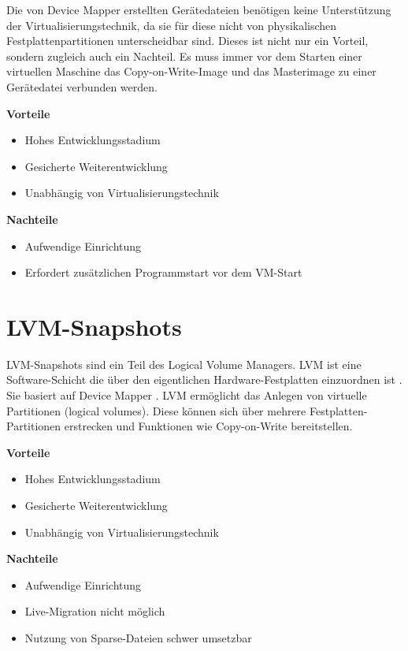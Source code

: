 Die von Device Mapper erstellten Gerätedateien benötigen keine Unterstützung der Virtualisierungstechnik, da sie für diese nicht von physikalischen Festplattenpartitionen unterscheidbar sind. Dieses ist nicht nur ein Vorteil, sondern zugleich auch ein Nachteil. Es muss immer vor dem Starten einer virtuellen Maschine das Copy-on-Write-Image und das Masterimage zu einer Gerätedatei verbunden werden.  

\textbf{Vorteile}
\begin{itemize}
 \item Hohes Entwicklungsstadium
 \item Gesicherte Weiterentwicklung
 \item Unabhängig von Virtualisierungstechnik
\end{itemize}

\textbf{Nachteile}
\begin{itemize}
 \item Aufwendige Einrichtung
 \item Erfordert zusätzlichen Programmstart vor dem VM-Start
\end{itemize}

\section{LVM-Snapshots}
LVM-Snapshots sind ein Teil des Logical Volume Managers. LVM ist eine Software-Schicht die über den eigentlichen Hardware-Festplatten einzuordnen ist \cite{lvmselflinux} \cite{lvmhowto}. Sie basiert auf Device Mapper \cite{lvmsource}. LVM ermöglicht das Anlegen von virtuelle Partitionen (logical volumes). Diese können sich über mehrere Festplatten-Partitionen erstrecken und Funktionen wie Copy-on-Write bereitstellen.

\textbf{Vorteile}
\begin{itemize}
 \item Hohes Entwicklungsstadium
 \item Gesicherte Weiterentwicklung
 \item Unabhängig von Virtualisierungstechnik
\end{itemize}

\textbf{Nachteile}
\begin{itemize}
 \item Aufwendige Einrichtung
 \item Live-Migration nicht möglich
 \item Nutzung von Sparse-Dateien schwer umsetzbar
\end{itemize}

